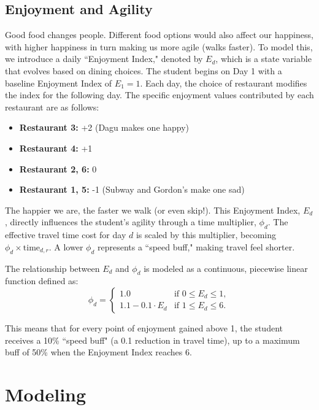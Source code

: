 \documentclass{article}
\begin{document}
\subsection{Enjoyment and Agility}
\label{sec:happiness}
Good food changes people. Different food options would also affect our happiness, with higher happiness in turn making us more agile (walks faster). To model this, we introduce a daily ``Enjoyment Index," denoted by $E_d$, which is a state variable that evolves based on dining choices.
The student begins on Day 1 with a baseline Enjoyment Index of $E_1 = 1$. Each day, the choice of restaurant modifies the index for the following day. The specific enjoyment values contributed by each restaurant are as follows:
\begin{itemize}
\item \textbf{Restaurant 3:} +2 (Dagu makes one happy)
\item \textbf{Restaurant 4:} +1
\item \textbf{Restaurant 2, 6:} 0
\item \textbf{Restaurant 1, 5:} -1 (Subway and Gordon's make one sad)
\end{itemize}

The happier we are, the faster we walk (or even skip!). This Enjoyment Index, \(E_d\), directly influences the student's agility through a time multiplier, \(\phi_d\). The effective travel time cost for day \(d\) is scaled by this multiplier, becoming \(\phi_d \times \text{time}_{d,r}\). A lower \(\phi_d\) represents a ``speed buff," making travel feel shorter.

The relationship between \(E_d\) and \(\phi_d\) is modeled as a continuous, piecewise linear function defined as:
\begin{equation}
\phi_d =
\begin{cases}
1.0 & \text{if } 0 \le E_d \le 1, \\
1.1 - 0.1 \cdot E_d & \text{if } 1 \le E_d \le 6.
\end{cases}
\label{eq:phi}
\end{equation}

This means that for every point of enjoyment gained above 1, the student receives a 10\% ``speed buff" (a 0.1 reduction in travel time), up to a maximum buff of 50\% when the Enjoyment Index reaches 6.


\section{Modeling}
\end{document}
